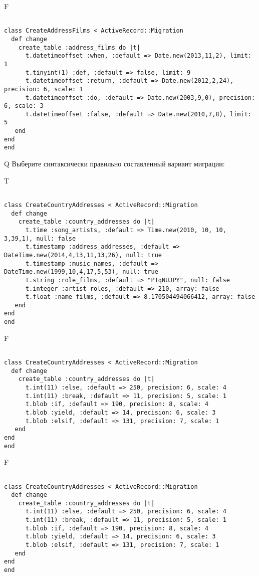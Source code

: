 F
\begin{verbatim}
		
class CreateAddressFilms < ActiveRecord::Migration 
  def change 
    create_table :address_films do |t| 
      t.datetimeoffset :when, :default => Date.new(2013,11,2), limit: 1
      t.tinyint(1) :def, :default => false, limit: 9
      t.datetimeoffset :return, :default => Date.new(2012,2,24), precision: 6, scale: 1
      t.datetimeoffset :do, :default => Date.new(2003,9,0), precision: 6, scale: 3
      t.datetimeoffset :false, :default => Date.new(2010,7,8), limit: 5
   end
end
end
\end{verbatim}

Q
Выберите синтаксически правильно составленный вариант миграции:

T
\begin{verbatim}
		
class CreateCountryAddresses < ActiveRecord::Migration 
  def change 
    create_table :country_addresses do |t| 
      t.time :song_artists, :default => Time.new(2010, 10, 10, 3,39,1), null: false
      t.timestamp :address_addresses, :default => DateTime.new(2014,4,13,11,13,26), null: true
      t.timestamp :music_names, :default => DateTime.new(1999,10,4,17,5,53), null: true
      t.string :role_films, :default => "PTqNUJPY", null: false
      t.integer :artist_roles, :default => 210, array: false
      t.float :name_films, :default => 8.170504494066412, array: false
   end
end
end
\end{verbatim}

F
\begin{verbatim}
		
class CreateCountryAddresses < ActiveRecord::Migration 
  def change 
    create_table :country_addresses do |t| 
      t.int(11) :else, :default => 250, precision: 6, scale: 4
      t.int(11) :break, :default => 11, precision: 5, scale: 1
      t.blob :if, :default => 190, precision: 8, scale: 4
      t.blob :yield, :default => 14, precision: 6, scale: 3
      t.blob :elsif, :default => 131, precision: 7, scale: 1
   end
end
end
\end{verbatim}

F
\begin{verbatim}
		
class CreateCountryAddresses < ActiveRecord::Migration 
  def change 
    create_table :country_addresses do |t| 
      t.int(11) :else, :default => 250, precision: 6, scale: 4
      t.int(11) :break, :default => 11, precision: 5, scale: 1
      t.blob :if, :default => 190, precision: 8, scale: 4
      t.blob :yield, :default => 14, precision: 6, scale: 3
      t.blob :elsif, :default => 131, precision: 7, scale: 1
   end
end
end
\end{verbatim}

